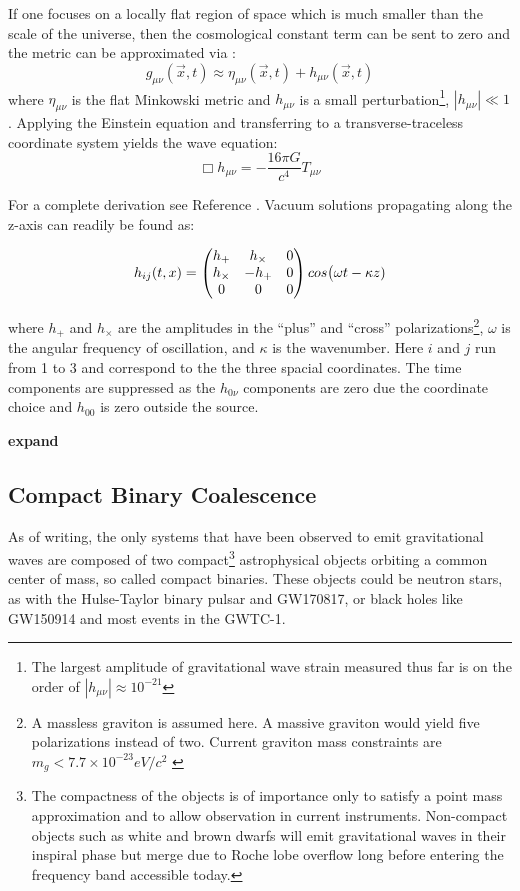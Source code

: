 \documentclass [12pt, proquest]{uwthesis}[2019]
\begin{document}
If one focuses on a locally flat region of space which is much smaller than the scale of the universe, then the cosmological constant term can be sent to zero and the metric can be approximated via \cite{GWBook}:
\begin{equation}
g_{\mu \nu}(\vec x,t)\approx\eta_{\mu \nu}(\vec x,t)+h_{\mu \nu}(\vec x,t)
\end{equation}
where $\eta_{\mu \nu}$ is the flat Minkowski metric and $h_{\mu \nu}$ is a small perturbation\footnote{The largest amplitude of gravitational wave strain measured thus far is on the order of $|h_{\mu \nu}|\approx 10^{-21}$\cite{GW150914}}, $|h_{\mu \nu}|\ll 1$. Applying the Einstein equation and transferring to a transverse-traceless coordinate system yields the wave equation:
\begin{equation}
\Box h_{\mu \nu}=-\frac{16 \pi G}{c^4}T_{\mu \nu}
\end{equation}

For a complete derivation see Reference \cite{GWBook}. Vacuum solutions propagating along the z-axis can readily be found as:

\begin{equation}
h_{ij}(t,x)=\begin{pmatrix} h_+ & h_\times & 0 \\ h_\times & -h_+ & 0 \\ 0 & 0 & 0\end{pmatrix} \\cos\big(\omega t - \kappa z)
\end{equation}

where $h_+$ and $h_\times$ are the amplitudes in the ``plus'' and ``cross'' polarizations\footnote{A massless graviton is assumed here. A massive graviton would yield five polarizations instead of two. Current graviton mass constraints are $m_g< 7.7\times 10^{-23} eV/c^2$ \cite{some}}, $\omega$ is the angular frequency of oscillation, and $\kappa$ is the wavenumber. Here $i$ and $j$ run from 1 to 3 and correspond to the the three spacial coordinates. The time components are suppressed as the $h_{0\nu}$ components are zero due the coordinate choice and $h_{00}$ is zero outside the source. 

\textbf{expand}

\subsection{Compact Binary Coalescence}\label{CBC}

As of writing, the only systems that have been observed to emit gravitational waves are composed of two compact\footnote{The compactness of the objects is of importance only to satisfy a point mass approximation and to allow observation in current instruments. Non-compact objects such as white and brown dwarfs will emit gravitational waves in their inspiral phase but merge due to Roche lobe overflow long before entering the frequency band accessible today.} astrophysical objects orbiting a common center of mass, so called compact binaries. These objects could be neutron stars, as with the Hulse-Taylor binary pulsar\cite{hulseTaylor} and GW170817\cite{GW170817}, or black holes like GW150914\cite{GW150914} and most events in the GWTC-1\cite{GWTC}.
\end{document}
